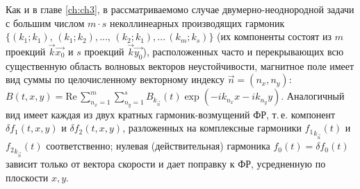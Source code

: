 Как и в главе \ref{ch:ch3}, в рассматриваемомо случае двумерно-неоднородной задачи с большим числом $m \cdot s$ неколлинеарных производящих гармоник
$\{ (k_{1}; k_{1}),\, (k_{1}; k_{2}),...,\, (k_{2}; k_{1}),...\, (k_{m}; k_{s}) \}$ (их компоненты состоят из $m$ проекций $\vec{k}\vec{x_0}$ и $s$ проекций $\vec{k}\vec{y_0}$), расположенных часто и перекрывающих всю существенную область волновых векторов неустойчивости,
магнитное поле имеет вид суммы по целочисленному векторному индексу $\vec{n}=(n_x,n_y)$:
$B(t,x,y)= \mathrm{Re} \, \sum^{m}_{n_x=1}\sum_{n_y=1}^sB_{k_{\vec{n}}}(t)\exp(- ik_{n_{x}}x - ik_{n_{y}}y)$.
Аналогичный вид имеет каждая из двух кратных гармоник-возмущений ФР, т.\,е. компонент $\delta f_1(t,x,y)$ и $\delta f_2(t,x,y)$, разложенных на комплексные гармоники ${f_1}_{k_{\vec{n}}}(t)$ и ${f_2}_{k_{\vec{n}}}(t)$ соответственно; нулевая (действительная) гармоника $f_0(t)=\delta f_0(t)$ зависит только от вектора скорости и дает поправку к ФР, усредненную по плоскости $x,y$. 

